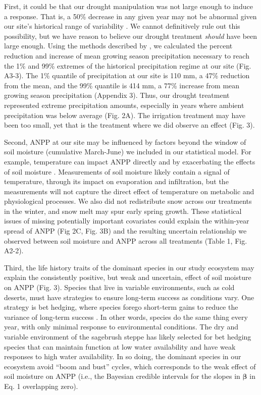 \documentclass[fleqn,10pt,lineno]{wlpeerj} %
\begin{document}
First, it could be that our drought manipulation was not large enough to
induce a response. That is, a 50\% decrease in any given year may not be
abnormal given our site's historical range of variability
\citep{Knapp2017}. We cannot definitively rule out this possibility, but
we have reason to believe our drought treatment \emph{should} have been
large enough. Using the methods described by \citet{Lemoine2016}, we
calculated the percent reduction and increase of mean growing season
precipitation necessary to reach the 1\% and 99\% extremes of the
historical precipitation regime at our site (Fig. A3-3). The 1\%
quantile of precipitation at our site is 110 mm, a 47\% reduction from
the mean, and the 99\% quantile is 414 mm, a 77\% increase from mean
growing season precipitation (Appendix 3). Thus, our drought treatment
represented extreme precipitation amounts, especially in years where
ambient precipitation was below average (Fig. 2A). The irrigation
treatment may have been too small, yet that is the treatment where we
did observe an effect (Fig. 3).

Second, ANPP at our site may be influenced by factors beyond the window
of soil moisture (cumulative March-June) we included in our statistical
model. For example, temperature can impact ANPP directly
\citep{Epstein1997} and by exacerbating the effects of soil moisture
\citep{DeBoeck2011}. Measurements of soil moisture likely contain a
signal of temperature, through its impact on evaporation and
infiltration, but the measurements will not capture the direct effect of
temperature on metabolic and physiological processes. We also did not
redistribute snow across our treatments in the winter, and snow melt may
spur early spring growth. These statistical issues of missing
potentially important covariates could explain the within-year spread of
ANPP (Fig 2C, Fig. 3B) and the resulting uncertain relationship we
observed between soil moisture and ANPP across all treatments (Table 1,
Fig. A2-2).

Third, the life history traits of the dominant species in our study
ecosystem may explain the consistently positive, but weak and uncertain,
effect of soil moisture on ANPP (Fig. 3). Species that live in variable
environments, such as cold deserts, must have strategies to ensure
long-term success as conditions vary. One strategy is bet hedging, where
species forego short-term gains to reduce the variance of long-term
success \citep{Seger1987}. In other words, species do the same thing
every year, with only minimal response to environmental conditions. The
dry and variable environment of the sagebrush steppe has likely selected
for bet hedging species that can maintain function at low water
availability and have weak responses to high water availability. In so
doing, the dominant species in our ecosystem avoid ``boom and bust''
cycles, which corresponds to the weak effect of soil moisture on ANPP
(i.e., the Bayesian credible intervals for the slopes in
\(\boldsymbol{\beta}\) in Eq. 1 overlapping zero).
\end{document}
